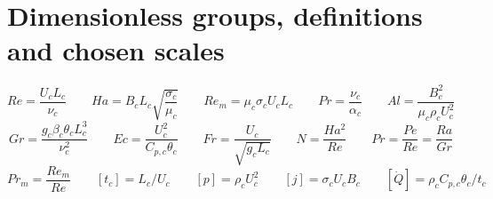 \documentclass[landscape,11pt]{article}
\begin{document}
\section{Dimensionless groups, definitions and chosen scales}
\begin{equation}
	Re = \frac{U_c L_c}{\nu_c} \qquad
	Ha = B_c L_c \sqrt{\frac{\sigma_c}{\mu_c}} \qquad
	Re_m = \mu_c \sigma_c U_c L_c \qquad
	Pr = \frac{\nu_c}{\alpha_c} \qquad
	Al = \frac{B_c^2}{\mu_c \rho_c U_c^2} \qquad
\end{equation}
\begin{equation}
	Gr = \frac{g_c \beta_c \theta_c L_c^3}{\nu_c^2} \qquad
	Ec = \frac{U_c^2}{C_{p,c} \theta_c} \qquad
	Fr = \frac{U_c}{\sqrt{g_c L_c}} \qquad
	N = \frac{Ha^2}{Re} \qquad
	Pr = \frac{Pe}{Re}=\frac{Ra}{Gr}
\end{equation}
\begin{equation}
	Pr_{m} = \frac{Re_m}{Re} \qquad
	[t_c] = L_c/U_c \qquad
	[p] = \rho_c U_c^2 \qquad
	[j] = \sigma_c U_c B_c \qquad
	[\dot{Q}] = \rho_c C_{p,c} \theta_c / t_c
\end{equation}
\end{document}
